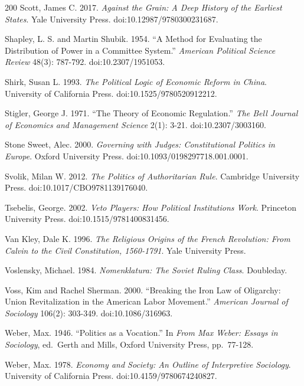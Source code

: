 \documentclass[11pt,letterpaper]{article}
\theoremstyle{definition}
\theoremstyle{remark}
\begin{document}
\begin{thebibliography}{200}
Scott, James C. 2017. \emph{Against the Grain: A Deep History of the Earliest States}. Yale University Press. doi:10.12987/9780300231687.

Shapley, L. S. and Martin Shubik. 1954. ``A Method for Evaluating the Distribution of Power in a Committee System.'' \emph{American Political Science Review} 48(3): 787-792. doi:10.2307/1951053.

Shirk, Susan L. 1993. \emph{The Political Logic of Economic Reform in China}. University of California Press. doi:10.1525/9780520912212.

Stigler, George J. 1971. ``The Theory of Economic Regulation.'' \emph{The Bell Journal of Economics and Management Science} 2(1): 3-21. doi:10.2307/3003160.

Stone Sweet, Alec. 2000. \emph{Governing with Judges: Constitutional Politics in Europe}. Oxford University Press. doi:10.1093/0198297718.001.0001.

Svolik, Milan W. 2012. \emph{The Politics of Authoritarian Rule}. Cambridge University Press. doi:10.1017/CBO9781139176040.

Tsebelis, George. 2002. \emph{Veto Players: How Political Institutions Work}. Princeton University Press. doi:10.1515/9781400831456.

Van Kley, Dale K. 1996. \emph{The Religious Origins of the French Revolution: From Calvin to the Civil Constitution, 1560-1791}. Yale University Press.

Voslensky, Michael. 1984. \emph{Nomenklatura: The Soviet Ruling Class}. Doubleday.

Voss, Kim and Rachel Sherman. 2000. ``Breaking the Iron Law of Oligarchy: Union Revitalization in the American Labor Movement.'' \emph{American Journal of Sociology} 106(2): 303-349. doi:10.1086/316963.

Weber, Max. 1946. ``Politics as a Vocation.'' In \emph{From Max Weber: Essays in Sociology}, ed.~Gerth and Mills, Oxford University Press, pp.~77-128.

Weber, Max. 1978. \emph{Economy and Society: An Outline of Interpretive Sociology}. University of California Press. doi:10.4159/9780674240827.


\end{thebibliography}
\end{document}
